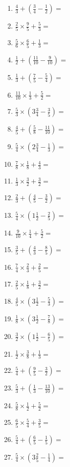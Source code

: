 \documentclass[12pt]{article}
\begin{document}
\begin{enumerate}[itemsep=1.5cm]
	\item $\displaystyle \frac{4}{3} + \left( \frac{3}{4} - \frac{1}{2} \right) =$
	\item $\displaystyle \frac{2}{5} \times \frac{9}{5} + \frac{5}{3} =$
	\item $\displaystyle \frac{5}{6} \times \frac{6}{5} + \frac{1}{3} =$
	\item $\displaystyle \frac{1}{2} + \left( \frac{11}{10} - \frac{9}{10} \right) =$
	\item $\displaystyle \frac{1}{3} + \left( \frac{7}{5} - \frac{5}{4} \right) =$
	\item $\displaystyle \frac{11}{10} \times \frac{1}{3} + \frac{5}{2} =$
	\item $\displaystyle \frac{5}{3} \times \left( 3 \frac{3}{4} - \frac{3}{5} \right) =$
	\item $\displaystyle \frac{4}{5} + \left( \frac{5}{8} - \frac{11}{10} \right) =$
	\item $\displaystyle \frac{5}{4} \times \left( 2 \frac{3}{4} - \frac{1}{3} \right) =$

	\item $\displaystyle \frac{7}{8} \times \frac{1}{8} + \frac{4}{3} =$
	\item $\displaystyle \frac{1}{3} \times \frac{3}{2} + \frac{3}{2} =$
	\item $\displaystyle \frac{2}{3} + \left( \frac{4}{5} - \frac{3}{2} \right) =$
	\item $\displaystyle \frac{5}{4} \times \left( 1 \frac{1}{2} - \frac{2}{5} \right) =$
	\item $\displaystyle \frac{9}{10} \times \frac{1}{4} + \frac{5}{2} =$
	\item $\displaystyle \frac{3}{5} + \left( \frac{4}{3} - \frac{8}{5} \right) =$
	\item $\displaystyle \frac{7}{4} \times \frac{2}{3} + \frac{2}{5} =$
	\item $\displaystyle \frac{2}{5} \times \frac{1}{8} + \frac{3}{2} =$
	\item $\displaystyle \frac{4}{5} \times \left( 3 \frac{1}{2} - \frac{5}{3} \right) =$

	\item $\displaystyle \frac{1}{8} \times \left( 3 \frac{1}{2} - \frac{7}{8} \right) =$
	\item $\displaystyle \frac{3}{2} \times \left( 1 \frac{1}{2} - \frac{6}{5} \right) =$
	\item $\displaystyle \frac{1}{2} \times \frac{3}{8} + \frac{1}{3} =$
	\item $\displaystyle \frac{5}{4} + \left( \frac{9}{5} - \frac{3}{2} \right) =$
	\item $\displaystyle \frac{5}{3} + \left( \frac{1}{3} - \frac{13}{10} \right) =$
	\item $\displaystyle \frac{5}{8} \times \frac{1}{2} + \frac{5}{2} =$
	\item $\displaystyle \frac{6}{5} \times \frac{5}{4} + \frac{3}{5} =$
	\item $\displaystyle \frac{5}{4} + \left( \frac{6}{5} - \frac{1}{5} \right) =$
	\item $\displaystyle \frac{5}{4} \times \left( 3 \frac{2}{5} - \frac{1}{4} \right) =$


\end{enumerate}
\end{document}
